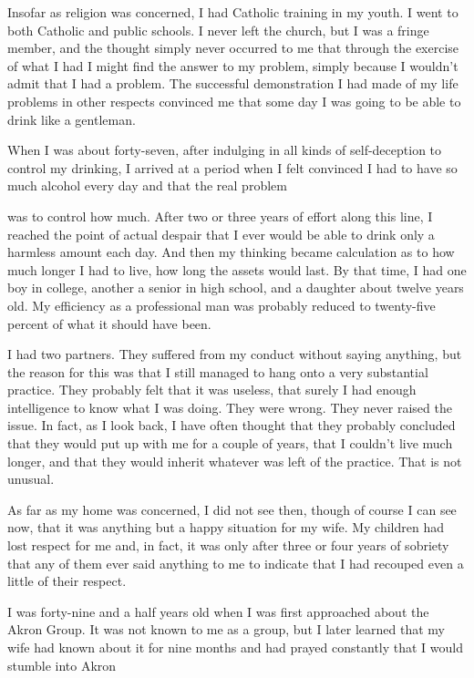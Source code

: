 \begin{biblechapter}
Insofar as religion was concerned, I had Catholic training in my youth. I went to both Catholic and public schools. I never left the church, but I was a fringe member, and the thought simply never occurred to me that through the exercise of what I had I might find the answer to my problem, simply because I wouldn’t admit that I had a problem. The successful demonstration I had made of my life problems in other respects convinced me that some day I was going to be able to drink like a gentleman.

When I was about forty-seven, after indulging in all kinds of self-deception to control my drinking, I arrived at a period when I felt convinced I had to have so much alcohol every day and that the real problem

was to control how much. After two or three years of effort along this line, I reached the point of actual despair that I ever would be able to drink only a harmless amount each day. And then my thinking became calculation as to how much longer I had to live, how long the assets would last. By that time, I had one boy in college, another a senior in high school, and a daughter about twelve years old. My efficiency as a professional man was probably reduced to twenty-five percent of what it should have been.

I had two partners. They suffered from my conduct without saying anything, but the reason for this was that I still managed to hang onto a very substantial practice. They probably felt that it was useless, that surely I had enough intelligence to know what I was doing. They were wrong. They never raised the issue. In fact, as I look back, I have often thought that they probably concluded that they would put up with me for a couple of years, that I couldn’t live much longer, and that they would inherit whatever was left of the practice. That is not unusual.

As far as my home was concerned, I did not see then, though of course I can see now, that it was anything but a happy situation for my wife. My children had lost respect for me and, in fact, it was only after three or four years of sobriety that any of them ever said anything to me to indicate that I had recouped even a little of their respect.

I was forty-nine and a half years old when I was first approached about the Akron Group. It was not known to me as a group, but I later learned that my wife had known about it for nine months and had prayed constantly that I would stumble into Akron


\end{biblechapter}
